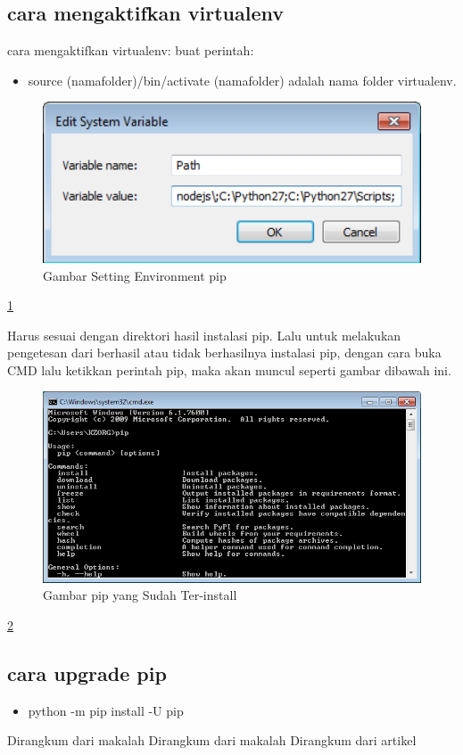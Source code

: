 	\subsection{cara mengaktifkan virtualenv}
	cara mengaktifkan virtualenv:
	buat perintah:
\begin{itemize}
			\item source (namafolder)/bin/activate
				(namafolder) adalah nama folder virtualenv.
		\end{itemize}		  
	\begin{figure} [ht]
		\centerline{\includegraphics[width=1\textwidth]{figures/setting-env.png}}
		\caption{Gambar Setting Environment pip}
		\label{setting-env}
	\end{figure}
	
	\ref{setting-env}
	
	Harus sesuai dengan direktori hasil instalasi pip. Lalu untuk melakukan pengetesan dari berhasil atau tidak berhasilnya instalasi pip, dengan cara buka CMD lalu ketikkan perintah pip, maka akan muncul seperti gambar dibawah ini.
	
	\begin{figure} [ht]
		\centerline{\includegraphics[width=1\textwidth]{figures/pip-terinstall.png}}
		\caption{Gambar pip yang Sudah Ter-install}
		\label{pip-terinstall}
	\end{figure}
	
	\ref{pip-terinstall}
				  

	\subsection{cara upgrade pip}
		\begin{itemize}
			\item python -m pip install -U pip
		\end{itemize}
		
	
	Dirangkum dari makalah \cite{feautrierpip}
	Dirangkum dari makalah \cite{nation2011qutip}
	Dirangkum dari artikel \cite{jewett2016moltemplate}

